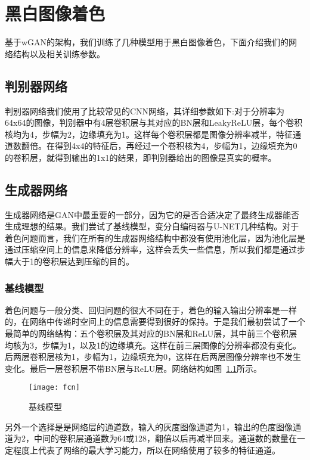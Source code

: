 \chapter{黑白图像着色}
\label{cha:3-image-color}

  基于wGAN的架构，我们训练了几种模型用于黑白图像着色，下面介绍我们的网络结构以及相关训练参数。

\section{判别器网络}
\label{sec:3-d-net}
  
  判别器网络我们使用了比较常见的CNN网络，其详细参数如下:对于分辨率为64x64的图像，判别器中有4层卷积层与其对应的BN层和LeakyReLU层，每个卷积核均为4，步幅为2，边缘填充为1。这样每个卷积层都是图像分辨率减半，特征通道数翻倍。在得到4x4的特征后，再经过一个卷积核为4，步幅为1，边缘填充为0的卷积层，就得到输出的1x1的结果，即判别器给出的图像是真实的概率。
  
\section{生成器网络}
\label{sec:3-g-net}

  生成器网络是GAN中最重要的一部分，因为它的是否合适决定了最终生成器能否生成理想的结果。我们尝试了基线模型，变分自编码器与U-NET几种结构。对于着色问题而言，我们在所有的生成器网络结构中都没有使用池化层，因为池化层是通过压缩空间上的信息来降低分辨率，这样会丢失一些信息，所以我们都是通过步幅大于1的卷积层达到压缩的目的。

\subsection{基线模型}
\label{sec:3-fcn}
  
  着色问题与一般分类、回归问题的很大不同在于，着色的输入输出分辨率是一样的，在网络中传递时空间上的信息需要得到很好的保持。于是我们最初尝试了一个最简单的网络结构：五个卷积层及其对应的BN层和ReLU层，其中前三个卷积层均核为3，步幅为1，以及1的边缘填充。这样在前三层图像的分辨率都没有变化。后两层卷积层核为1，步幅为1，边缘填充为0，这样在后两层图像分辨率也不发生变化。最后一层卷积层不带BN层与ReLU层。网络结构如图~\ref{fig:fcn}所示。

  \begin{figure}[H]
    \centering
    \texttt{[image: fcn]}
    \caption{基线模型}
    \label{fig:fcn}
  \end{figure}

  另外一个选择是是网络层的通道数，输入的灰度图像通道为1，输出的色度图像通道为2，中间的卷积层通道数为64或128，翻倍以后再减半回来。通道数的数量在一定程度上代表了网络的最大学习能力，所以在网络使用了较多的特征通道。

